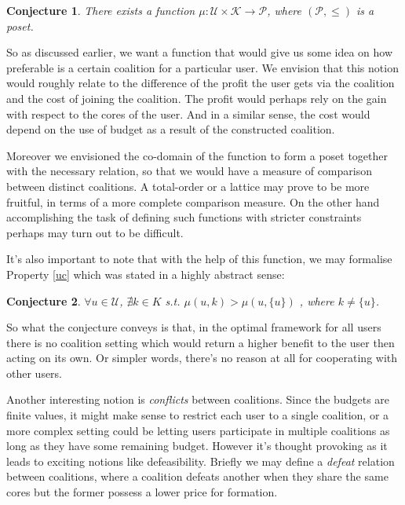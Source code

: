 \documentclass{article}
\newtheorem{conjecture}{Conjecture}
\begin{document}
{\color{red}
\begin{conjecture}
There exists a function $\mu: \mathcal{U} \times \mathcal{K} \rightarrow \mathcal{P}$, where $(\mathcal{P}, \le)$ is a poset.
\end{conjecture}
}

So as discussed earlier, we want a function that would give us some idea on how preferable is a certain coalition for a particular user. We envision that this notion would roughly relate to the difference of the profit the user gets via the coalition and the cost of joining the coalition. The profit would perhaps rely on the gain with respect to the cores of the user. And in a similar sense, the cost would depend on the use of budget as a result of the constructed coalition. 

Moreover we envisioned the co-domain of the function to form a poset together with the necessary relation, so that we would have a measure of comparison between distinct coalitions. A total-order or a lattice may prove to be more fruitful, in terms of a more complete comparison measure. On the other hand accomplishing the task of defining such functions with stricter constraints perhaps may turn out to be difficult.   

It's also important to note that with the help of this function, we may formalise Property \ref{uc} which was stated in a highly abstract sense:

{\color{red}
\begin{conjecture}
$\forall u \in \mathcal{U}$, $\nexists k \in K$ s.t. $\mu(u, k) > \mu(u, \{u\})$ , where $k \neq \{u\}$.
\end{conjecture}
}

So what the conjecture conveys is that, in the optimal framework for all users there is no coalition setting which would return a higher benefit to the user then acting on its own. Or simpler words, there's no reason at all for cooperating with other users.  


Another interesting notion is \emph{conflicts} between coalitions. Since the budgets are finite values, it might make sense to restrict each user to a single coalition, or a more complex setting could be letting users participate in multiple coalitions as long as they have some remaining budget. However it's thought provoking as it leads to exciting notions like defeasibility. Briefly we may define a \emph{defeat} relation between coalitions, where a coalition defeats another when they share the same cores but the former possess a lower price for formation.
\end{document}
